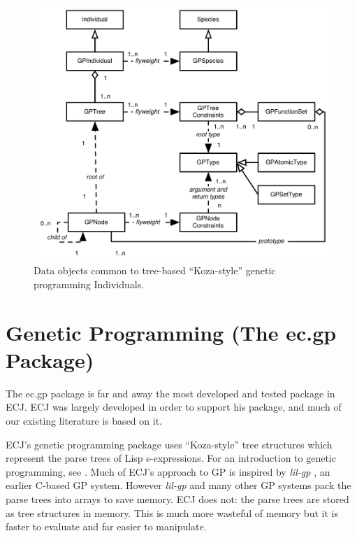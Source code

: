 \documentclass[twoside,10pt]{book}
\newcommand\package[1]{\index{#1}\textsf{#1}}
\begin{document}
\begin{figure}
\begin{center}
\includegraphics[width=6.5in]{GP.pdf}
\end{center}
\caption{Data objects common to tree-based ``Koza-style'' genetic programming Individuals.}
\label{GP}
\end{figure}


\section{Genetic Programming (The \package{ec.gp} Package)}
\label{ec.gp}

The \package{ec.gp} package is far and away the most developed and tested package in ECJ.  ECJ was largely developed in order to support his package, and much of our existing literature is based on it.

ECJ's genetic programming package uses ``Koza-style'' tree structures \cite{koza:book,koza:gp2} which represent the parse trees of Lisp s-expressions.   For an introduction to genetic programming, see \cite{poli08:fieldguide}.  Much of ECJ's approach to GP is inspired by {\it lil-gp} \cite{lilgp}, an earlier C-based GP system.  However {\it lil-gp} and many other GP systems pack the parse trees into arrays to save memory.  ECJ does not: the parse trees are stored as tree structures in memory.  This is much more wasteful of memory but it is faster to evaluate and far easier to manipulate.
\end{document}
